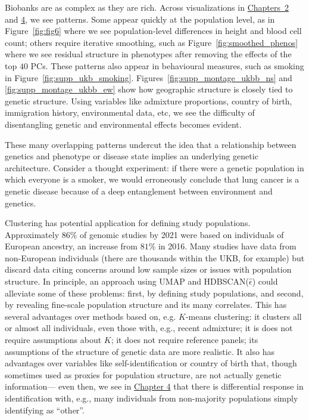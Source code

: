 Biobanks are as complex as they are rich. Across visualizations in \hyperref[chap:chapter2]{Chapters~2} and \hyperref[chap:chapter4]{4}, we see patterns. Some appear quickly at the population level, as in Figure~\ref{fig:fig6} where we see population-level differences in height and blood cell count; others require iterative smoothing, such as  Figure~\ref{fig:smoothed_phenos} where we see residual structure in phenotypes after removing the effects of the top $40$ PCs. These patterns also appear in behavioural measures, such as smoking in Figure~\ref{fig:supp_ukb_smoking}. Figures~\ref{fig:supp_montage_ukbb_ns} and \ref{fig:supp_montage_ukbb_ew} show how geographic structure is closely tied to genetic structure. Using variables like admixture proportions, country of birth, immigration history, environmental data, etc, we see the difficulty of disentangling genetic and environmental effects becomes evident.

These many overlapping patterns  undercut the idea that a relationship between genetics and phenotype or disease state implies an underlying genetic architecture. Consider a thought experiment\citep{rose_sick_2001}: if there were a genetic population in which everyone is a smoker, we would erroneously conclude that lung cancer is a genetic disease because of a deep entanglement between environment and genetics. 

Clustering has potential application for defining study populations. Approximately $86\%$ of genomic studies by 2021 were based on individuals of European ancestry, an increase from $81\%$ in 2016\citep{fatumo_roadmap_2022,kaplan_polygenic_2022}. Many studies have data from non-European individuals (there are thousands within the UKB, for example) but discard data citing concerns around low sample sizes or issues with population structure\citep{ben-eghan_dont_2020}. In principle, an approach using UMAP and HDBSCAN($\hat{\epsilon}$) could alleviate some of these problems: first, by defining study populations, and second, by revealing fine-scale population structure and its many correlates. This has several advantages over methods based on, e.g. $K$-means clustering: it clusters all or almost all individuals, even those with, e.g., recent admixture; it is does not require assumptions about $K$; it does not require reference panels; its assumptions of the structure of genetic data are more realistic. It also has advantages over variables like self-identification or country of birth that, though sometimes used as proxies for population structure, are not actually genetic information--- even then, we see in \hyperref[chap:chapter4]{Chapter 4} that there is differential response in identification with, e.g., many individuals from non-majority populations simply identifying as ``other''.

